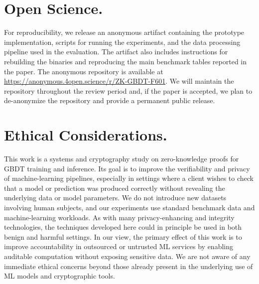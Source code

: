 \section{Open Science.}\label{sec:open-science}
For reproducibility, we release an anonymous artifact containing the
prototype implementation, scripts for running the experiments, and the data
processing pipeline used in the evaluation. The artifact also includes
instructions for rebuilding the binaries and reproducing the main benchmark
tables reported in the paper. The anonymous repository is available at
\url{https://anonymous.4open.science/r/ZK-GBDT-F601}. We will
maintain the repository throughout the review period and, if the paper is
accepted, we plan to de-anonymize the repository and provide a permanent public
release.

\section{Ethical Considerations.}
This work is a systems and cryptography study on zero-knowledge proofs for GBDT
training and inference. Its goal is to improve the verifiability and privacy of
machine-learning pipelines, especially in settings where a client wishes to
check that a model or prediction was produced correctly without revealing the
underlying data or model parameters. We do not introduce new datasets involving
human subjects, and our experiments use standard benchmark data and
machine-learning workloads. As with many privacy-enhancing and integrity
technologies, the techniques developed here could in principle be used in both
benign and harmful settings. In our view, the primary effect of this work is to
improve accountability in outsourced or untrusted ML services by enabling
auditable computation without exposing sensitive data. We are not aware of any
immediate ethical concerns beyond those already present in the underlying use of
ML models and cryptographic tools.